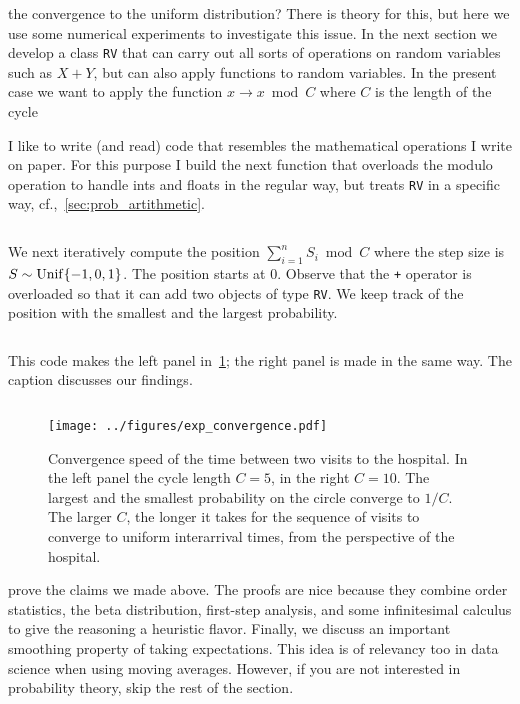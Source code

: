 \documentclass[stochastic-or.tex]{subfiles}
\begin{document}
 the convergence to the uniform distribution?
There is theory for this, but here we use some numerical experiments to investigate this issue.
In the next section we develop a class \texttt{RV} that can carry out all sorts of operations on random variables such as $X + Y$, but can also apply functions to random variables.
In the present case we want to apply the function $x \to x \bmod C$ where $C$ is the length of the cycle

I like to write (and read) code that resembles the mathematical operations I write on paper.
For this purpose I build the next function that overloads the modulo operation to handle ints and floats in the regular way, but treats \texttt{RV} in a specific way, cf.,~\cref{sec:prob_artithmetic}.

\inputminted[firstline=8, lastline=18]{python}{../code/exp_convergence.py} %

We next iteratively compute the position $\sum_{i=1}^{n} S_{i} \bmod C$ where the step size is $S\sim\mathrm{Unif}\{-1, 0, 1\}$.
The position starts at $0$. Observe that the \texttt{+} operator is overloaded so that it can add two objects of type \texttt{RV}. We keep track of the position with the smallest and the largest probability.

\inputminted[firstline=25, lastline=36]{python}{../code/exp_convergence.py} %

This code makes the left panel in~\cref{fig:conv-speed}; the right panel is made in the same way. The caption discusses our findings.
\inputminted[firstline=49, lastline=56]{python}{../code/exp_convergence.py} %



\begin{figure}[t]
\centering
\texttt{[image: ../figures/exp\_convergence.pdf]}
\caption{Convergence speed of the time between two visits to the hospital.
In the left panel the cycle length $C=5$, in the right $C=10$.
The largest and the smallest probability on the circle converge to $1/C$.
The larger $C$, the longer it takes for the sequence of visits to converge to uniform interarrival times, from the perspective of the hospital.}
\label{fig:conv-speed}
\end{figure}


 prove the claims we made above.
The proofs are nice because they combine order statistics, the beta distribution, first-step analysis, and some infinitesimal calculus to give the reasoning a heuristic flavor.
Finally, we discuss an important smoothing property of taking expectations. This idea is of relevancy too in data science when using  moving averages.
However, if you are not interested in probability theory, skip the rest of the section.
\end{document}
